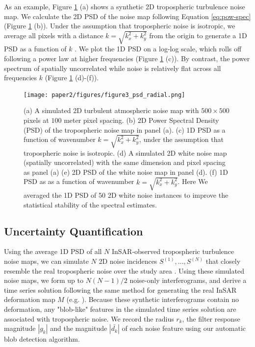 As an example, Figure \ref{fig:psd-example} (a) shows a synthetic 2D tropospheric turbulence noise map. We calculate the 2D PSD of the noise map following Equation \eqref{eq:pow-spec} (Figure \ref{fig:psd-example} (b)). Under the assumption that tropospheric noise is isotropic, we average all pixels with a distance  $k= \sqrt{k_x^2 + k_y^2}$ from the origin to generate a 1D PSD as a function of $k$ \citep{Hanssen2001RadarInterferometryData}.
We plot the 1D PSD on a log-log scale, which rolls off following a power law at higher frequencies (Figure \ref{fig:psd-example} (c)). By contrast, the power spectrum of spatially uncorrelated while noise is relatively flat across all frequencies $k$ (Figure \ref{fig:psd-example} (d)-(f)).




\begin{figure}
	\centering 
	\texttt{[image: paper2/figures/figure3\_psd\_radial.png]}
	\caption[Example 1D tropospheric PSD estimation]{
		(a) A simulated 2D turbulent atmospheric noise map with $ 500 \times 500 $ pixels at $100$ meter pixel spacing.
		(b) 2D Power Spectral Density (PSD) of the tropospheric noise map in panel (a).
		(c) 1D PSD as a function of wavenumber $k = \sqrt{k_x^2 + k_y^2}$, under the assumption that tropospheric noise is isotropic.
		(d) A simulated 2D white noise map (spatially uncorrelated) with the same dimension and pixel spacing as panel (a)
		(e) 2D PSD of the white noise map in panel (d).
		(f) 1D PSD as as a function of wavenumber $k = \sqrt{k_x^2 + k_y^2}$. Here We averaged the 1D PSD of 50 2D white noise instances to improve the statistical stability of the spectral estimates.
	}
	\label{fig:psd-example}
\end{figure}


\subsection{Uncertainty Quantification}
\label{subsec:methods-3-noise-sim}

Using the average 1D PSD of all $N$ InSAR-observed tropospheric turbulence noise maps, we can simulate $N$ 2D noise incidences  $S^{(1)},\dots, S^{(N)} $ that closely resemble the real tropospheric noise over the study area \citep{Hanssen2001RadarInterferometryData}. Using these simulated noise maps, we form up to $N(N-1)/2$ noise-only interferograms, and derive a time series solution following the same method for generating the real InSAR deformation map $M$ (e.g. \citep{Sandwell1998PhaseGradientApproach, Berardino2002NewAlgorithmSurface}). Because these synthetic interferograms contain no deformation, any "blob-like" features in the simulated time series solution are associated with tropospheric noise. We record the radius $r_k$,  the filter response magnitude $|g_k|$ and the magnitude $|\bar{d_k}|$ of each noise feature using our automatic blob detection algorithm.

